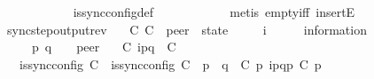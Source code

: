 \begin{isabellebody}
\ \ \ \ \ \ \ \ \ \ \isamarkupfalse%
\ is{\isacharunderscore}{\kern0pt}sync{\isacharunderscore}{\kern0pt}config{\isacharunderscore}{\kern0pt}def\isanewline
\ \ \ \ \ \ \ \ \ \ \isamarkupfalse%
\ {\isacharparenleft}{\kern0pt}metis\ empty{\isacharunderscore}{\kern0pt}iff\ insertE{\isacharparenright}{\kern0pt}\isanewline
\ \ \ \ \ \ \isamarkupfalse%
\isanewline
\ \ \ \ \isamarkupfalse%
\isanewline
\ \ \isamarkupfalse%
\isanewline
{}\isamarkupfalse%
%
\endisatagproof
{\isafoldproof}%
%
\isadelimproof
\isanewline
%
\endisadelimproof
\isanewline
{}\isamarkupfalse%
\ sync{\isacharunderscore}{\kern0pt}step{\isacharunderscore}{\kern0pt}output{\isacharunderscore}{\kern0pt}rev{\isacharcolon}{\kern0pt}\isanewline
\ \ \ C{}\ C{}\ {\isacharcolon}{\kern0pt}{\isacharcolon}{\kern0pt}\ {\isachardoublequoteopen}{\isacharprime}{\kern0pt}peer\ {\isasymRightarrow}\ {\isacharprime}{\kern0pt}state{\isachardoublequoteclose}\isanewline
\ \ \ \ \ i\ \ \ \ \ {\isacharcolon}{\kern0pt}{\isacharcolon}{\kern0pt}\ {\isachardoublequoteopen}{\isacharprime}{\kern0pt}information{\isachardoublequoteclose}\isanewline
\ \ \ \ \ p\ q\ \ \ {\isacharcolon}{\kern0pt}{\isacharcolon}{\kern0pt}\ {\isachardoublequoteopen}{\isacharprime}{\kern0pt}peer{\isachardoublequoteclose}\isanewline
\ \ \ {\isachardoublequoteopen}C{}\ {\isasymmidarrow}{\isasymlangle}{\isacharbang}{\kern0pt}{\isasymlangle}{\isacharparenleft}{\kern0pt}i\isactrlbsup p{\isasymrightarrow}q\isactrlesup {\isacharparenright}{\kern0pt}{\isasymrangle}{\isacharcomma}{\kern0pt}\ {\isasymzero}{\isasymrangle}{\isasymrightarrow}\ C{}{\isachardoublequoteclose}\isanewline
\ \ \ {\isachardoublequoteopen}is{\isacharunderscore}{\kern0pt}sync{\isacharunderscore}{\kern0pt}config\ C{}{\isachardoublequoteclose}\ \ {\isachardoublequoteopen}is{\isacharunderscore}{\kern0pt}sync{\isacharunderscore}{\kern0pt}config\ C{}{\isachardoublequoteclose}\ \ {\isachardoublequoteopen}p\ {\isasymnoteq}\ q{\isachardoublequoteclose}\ \ {\isachardoublequoteopen}C{}\ p\ {\isasymmidarrow}{\isacharbang}{\kern0pt}{\isasymlangle}{\isacharparenleft}{\kern0pt}i\isactrlbsup p{\isasymrightarrow}q\isactrlesup {\isacharparenright}{\kern0pt}{\isasymrangle}{\isasymrightarrow}p\ {\isacharparenleft}{\kern0pt}C{}\ p{\isacharparenright}{\kern0pt}{\isachardoublequoteclose}\isanewline

\end{isabellebody}

